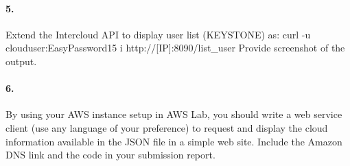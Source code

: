 \documentclass[a4paper]{article}
\begin{document}
\paragraph{5. } Extend the Intercloud API to display user list (KEYSTONE) as:
curl -u clouduser:EasyPassword15 \-i http://[IP]:8090/list\_user Provide screenshot of the output.

\paragraph{6. } By using your AWS instance setup in AWS Lab, you should write a web service client (use any language of your preference) to request and display the cloud information available in the JSON file in a simple web site. Include the Amazon DNS link and the code in your submission report.
\end{document}
